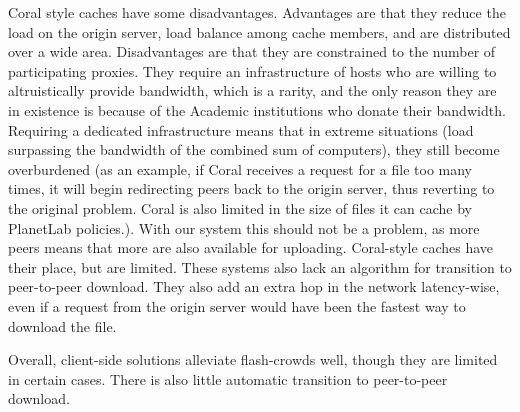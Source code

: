 Coral style caches have some disadvantages.  Advantages are that they reduce the load on the origin server, load balance among cache members, and are distributed over a wide area.  Disadvantages are that they are constrained to the number of participating proxies. They require an infrastructure of hosts who are willing to altruistically provide bandwidth, which is a rarity, and the only reason they are in existence is because of the Academic institutions who donate their bandwidth.  Requiring a dedicated infrastructure means that in extreme situations (load surpassing the bandwidth of the combined sum of computers), they still become overburdened (as an example, if Coral receives a request for a file too many times, it will begin redirecting peers back to the origin server, thus reverting to the original problem.  Coral is also limited in the size of files it can cache by PlanetLab policies.).  With our system this should not be a problem, as more peers means that more are also available for uploading.  Coral-style caches have their place, but are limited.  These systems also lack an algorithm for transition to peer-to-peer download.  They also add an extra hop in the network latency-wise, even if a request from the origin server would have been the fastest way to download the file.    


Overall, client-side solutions alleviate flash-crowds well, though they are limited in certain cases. There is also little automatic transition to peer-to-peer download.

